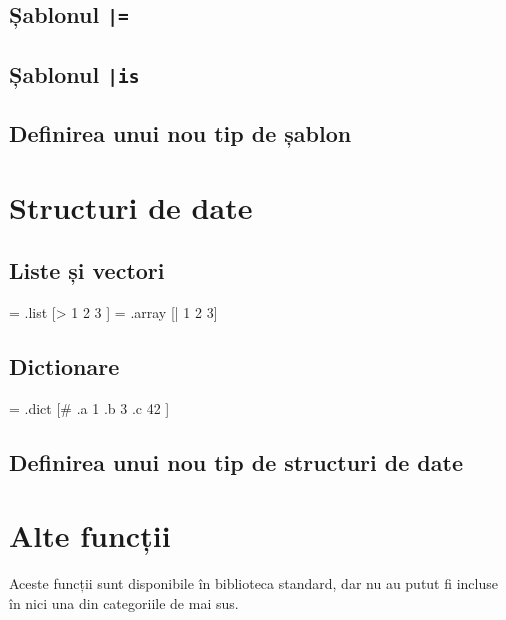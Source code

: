 \documentclass[12pt,a4paper]{memoir}
\begin{document}
\subsection{Șablonul \texttt{|=}}

\subsection{Șablonul \texttt{|is}}


\subsection{Definirea unui nou tip de șablon}

\section{Structuri de date}


\subsection{Liste și vectori}

\begin{code}
= .list [> 1 2 3 ]
= .array [| 1 2 3]
\end{code}

\subsection{Dictionare}

\begin{code}
= .dict [# 
  .a 1 
  .b 3
  .c 42 
]
\end{code}

\subsection{Definirea unui nou tip de structuri de date}


\section{Alte funcții}

Aceste funcții sunt disponibile în biblioteca standard, dar nu au putut fi incluse în nici una din categoriile de mai sus.
\end{document}
